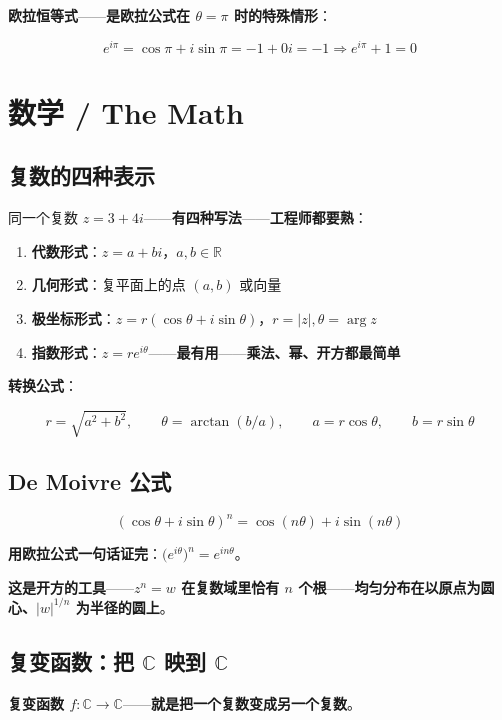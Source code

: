 \textbf{欧拉恒等式}——\textbf{是欧拉公式在 $\theta = \pi$ 时的特殊情形}：

\[
e^{i\pi} = \cos\pi + i\sin\pi = -1 + 0i = -1 \Longrightarrow e^{i\pi} + 1 = 0
\]

\section{数学 / The Math}

\subsection{复数的四种表示}

同一个复数 $z = 3 + 4i$——\textbf{有四种写法}——\textbf{工程师都要熟}：

\begin{enumerate}
\item \textbf{代数形式}：$z = a + bi$，$a, b \in \mathbb{R}$
\item \textbf{几何形式}：复平面上的点 $(a, b)$ 或向量
\item \textbf{极坐标形式}：$z = r(\cos\theta + i\sin\theta)$，$r = |z|, \theta = \arg z$
\item \textbf{指数形式}：$z = r e^{i\theta}$——\textbf{最有用}——\textbf{乘法、幂、开方都最简单}
\end{enumerate}

\textbf{转换公式}：

\[
r = \sqrt{a^2 + b^2}, \qquad \theta = \arctan(b/a), \qquad a = r\cos\theta, \qquad b = r\sin\theta
\]

\subsection{De Moivre 公式}

\[
(\cos\theta + i\sin\theta)^n = \cos(n\theta) + i\sin(n\theta)
\]

\textbf{用欧拉公式一句话证完}：$\bigl(e^{i\theta}\bigr)^n = e^{in\theta}$。

\textbf{这是\textbf{开方}的工具}——\textbf{$z^n = w$ 在复数域里恰有 $n$ 个根}——\textbf{均匀分布在以原点为圆心、$|w|^{1/n}$ 为半径的圆上}。

\subsection{复变函数：把 $\mathbb{C}$ 映到 $\mathbb{C}$}

\textbf{复变函数 $f: \mathbb{C} \to \mathbb{C}$}——\textbf{就是把一个复数变成另一个复数}。

